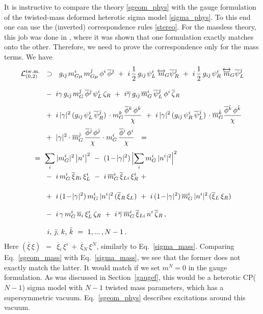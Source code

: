 \documentclass[12pt]{article}
\newcommand{\ov}{\overline}
\newcommand{\mc}[1]{\mathcal{#1}}
\newcommand{\bxir}{\ov{\xi}{}_R}
\newcommand{\bxil}{\ov{\xi}{}_L}
\newcommand{\xir}{\xi_R}
\newcommand{\xil}{\xi_L}
\newcommand{\bzr}{\ov{\zeta}{}_R}
\newcommand{\zr}{\zeta_R}
\newcommand{\bgamma}{\ov{\gamma}}
\newcommand{\bpsi}{\ov{\psi}{}}
\newcommand{\bphi}{\ov{\phi}{}}
\newcommand{\bxi}{\ov{\xi}{}}
\newcommand{\bj}{{\bar \jmath}}
\newcommand{\bk}{{\bar k}}
\begin{document}
	It is instructive to compare the theory \eqref{sgeom_phys} with the gauge formulation of  the
	twisted-mass deformed heterotic sigma
	model  \eqref{sigma_phys}. To this end one
can use the (inverted) correspondence rules \eqref{stereo}. 
	For the massless theory, this job was done in \cite{BSYhet}, where it was shown that one formulation exactly
	matches onto the other.
	Therefore, we need to prove the correspondence only for the mass  terms.
	We have
\begin{align}
%
\notag
	\mc{L}_{(0,2)}^\text{tw.m.} & ~~\supset~~ 
	g_{i\bj}\, m_{G\mu}^i\,m_{G\mu}^\bj\, \phi^i\, \bphi^\bj
	~+~ i\,\frac{1}{2}\,g_{i\bj}\,\psi_L^i\, \overleftrightarrow{m}{}_{\!G} \bpsi_R^\bj
	~+~ i\,\frac{1}{2}\,g_{i\bj}\,\psi_R^i\, \overleftrightarrow{\ov{m}}{}_{\!G} \bpsi_L^\bj
	\\[3mm]
%
\notag
	&~
	~-~ i\gamma\, g_{i\bj}\, m_G^\bj\,\bphi^\bj\, \psi_L^i\,\zr
	~+~ i\bgamma\, g_{i\bj}\,\ov{m}{}_G^i\, \bpsi_L^\bj\, \phi^i\,\bzr
	\\[2mm]
%
\notag
	&~
	~+~ i\, |\gamma|^2\, (g_{i\bj}\,\psi_L^i\,\bpsi_R^\bj)\, \cdot m_G^k \frac{\bphi^k\, \phi^k}{\chi}
	~+~ i\, |\gamma|^2\, (g_{i\bj}\,\psi_R^i\,\bpsi_L^\bj)\, \cdot \ov{m}{}_G^\bk \frac{\bphi^\bk\,\phi^\bk}{\chi}
	\\[1mm]
%
\notag
	&~
	~+~ |\gamma|^2 \cdot \ov{m}{}_G^\bj\,\frac{\bphi^\bj\,\phi^\bj}{\chi}
			\cdot m_G^i\, \frac{\bphi^i\, \phi^i}{\chi}
	~~=~~
	\\[1mm]
%
\label{sgeom_mass}
	&\!\!\!\!\!\!\!\!
	~=~
	\sum_i |m_G^i|^2 \left|n^i \right|^2 ~-~ (1 \!-\! |\gamma|^2)\, \Bigl| \sum_i m_G^i\, |n^i|^2 \Bigr|^2 
	\\
%
\notag
	&~
	~-~ i\,m_G^i\,\bxi_{Ri}\,\xi_L^i 
	~-~ i\,\ov{m}{}_G^i\, \bxi_{Li}\, \xi_R^i ~+~
	\\[4mm]
%
\notag
	&~
	~+~ i\,(1\!-\!|\gamma|^2)\, m_G^i\,|n^i|^2\, (\bxir\,\xil) 
	~+~ i\,(1\!-\!|\gamma|^2)\, \ov{m}{}_G^i\,|n^i|^2\, (\bxil\,\xir)
	\\[3mm]
%
\notag
	&~
	~-~ i\,\gamma\, m_G^i\,\ov{n}{}_i\, \xi_L^i\, \zr
	~+~ i\,\bgamma\, \ov{m}{}_G^i\, \bxi_{Li}\, n^i\, \bzr\,,
	\\[3mm]
%
\notag
	&~~~
	\text{$i$, $\bj$, $k$, $\bk$} ~=~ 1,...\,, N-1\,.
\end{align}
	Here 
$
	(\ov{\xi}\, \xi) ~~=~~ \ov{\xi}{}_i\, \xi^i  ~+~  \ov{\xi}{}_N\, \xi^N
$,
	similarly to Eq.~\eqref{sigma_mass}.
	Comparing Eq.~\eqref{sgeom_mass} with Eq.~\eqref{sigma_mass}, we   see that the former
	does not   exactly match   the latter.
	It would match if we set $ m^N = 0 $ in the gauge formulation.
	As was discussed in Section~\ref{gaugef}, this would be a heterotic CP($N-1$) sigma model
	with $ N-1 $ twisted mass parameters, which has a supersymmetric vacuum.
	Eq.~\eqref{sgeom_phys} describes excitations around this vacuum.
\end{document}
